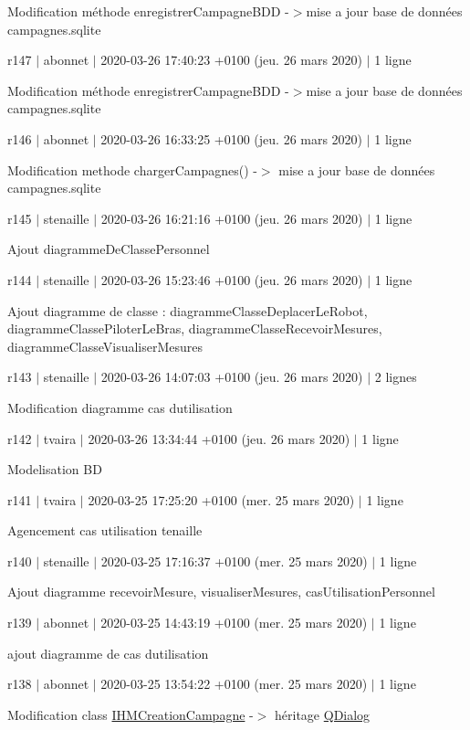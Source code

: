 Modification méthode enregistrer\+Campagne\+B\+DD -\/$>$mise a jour base de données campagnes.\+sqlite

r147 $\vert$ abonnet $\vert$ 2020-\/03-\/26 17\+:40\+:23 +0100 (jeu. 26 mars 2020) $\vert$ 1 ligne

Modification méthode enregistrer\+Campagne\+B\+DD -\/$>$mise a jour base de données campagnes.\+sqlite

r146 $\vert$ abonnet $\vert$ 2020-\/03-\/26 16\+:33\+:25 +0100 (jeu. 26 mars 2020) $\vert$ 1 ligne

Modification methode charger\+Campagnes() -\/$>$ mise a jour base de données campagnes.\+sqlite

r145 $\vert$ stenaille $\vert$ 2020-\/03-\/26 16\+:21\+:16 +0100 (jeu. 26 mars 2020) $\vert$ 1 ligne

Ajout diagramme\+De\+Classe\+Personnel

r144 $\vert$ stenaille $\vert$ 2020-\/03-\/26 15\+:23\+:46 +0100 (jeu. 26 mars 2020) $\vert$ 1 ligne

Ajout diagramme de classe \+: diagramme\+Classe\+Deplacer\+Le\+Robot, diagramme\+Classe\+Piloter\+Le\+Bras, diagramme\+Classe\+Recevoir\+Mesures, diagramme\+Classe\+Visualiser\+Mesures

r143 $\vert$ stenaille $\vert$ 2020-\/03-\/26 14\+:07\+:03 +0100 (jeu. 26 mars 2020) $\vert$ 2 lignes

Modification diagramme cas d\textquotesingle{}utilisation

r142 $\vert$ tvaira $\vert$ 2020-\/03-\/26 13\+:34\+:44 +0100 (jeu. 26 mars 2020) $\vert$ 1 ligne

Modelisation BD

r141 $\vert$ tvaira $\vert$ 2020-\/03-\/25 17\+:25\+:20 +0100 (mer. 25 mars 2020) $\vert$ 1 ligne

Agencement cas utilisation tenaille

r140 $\vert$ stenaille $\vert$ 2020-\/03-\/25 17\+:16\+:37 +0100 (mer. 25 mars 2020) $\vert$ 1 ligne

Ajout diagramme recevoir\+Mesure, visualiser\+Mesures, cas\+Utilisation\+Personnel

r139 $\vert$ abonnet $\vert$ 2020-\/03-\/25 14\+:43\+:19 +0100 (mer. 25 mars 2020) $\vert$ 1 ligne

ajout diagramme de cas d\textquotesingle{}utilisation

r138 $\vert$ abonnet $\vert$ 2020-\/03-\/25 13\+:54\+:22 +0100 (mer. 25 mars 2020) $\vert$ 1 ligne

Modification class \hyperlink{class_i_h_m_creation_campagne}{I\+H\+M\+Creation\+Campagne} -\/$>$ héritage \hyperlink{class_q_dialog}{Q\+Dialog}


